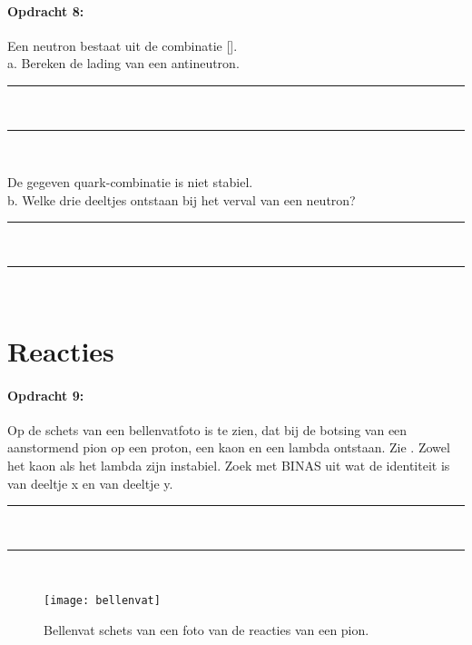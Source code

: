\paragraph{Opdracht 8:}
Een neutron bestaat uit de combinatie [\Pup\Pdown\Pdown].\\
a. Bereken de lading van een antineutron.
\begin{center}
    \rule{\textwidth}{0.3mm}\\
    \rule{\textwidth}{0.3mm}\\
\end{center}
De gegeven quark-combinatie is niet stabiel.\\
b. Welke drie deeltjes ontstaan bij het verval van een neutron?
\begin{center}
    \rule{\textwidth}{0.3mm}\\
    \rule{\textwidth}{0.3mm}\\
\end{center}

\section{Reacties}

\paragraph{Opdracht 9:}
Op de schets van een bellenvatfoto is te zien, dat bij de botsing van een 
aanstormend pion op een proton, een kaon en een lambda ontstaan. Zie 
.
Zowel het kaon als het lambda zijn instabiel.
Zoek met BINAS uit wat de identiteit is van deeltje x en van deeltje y.
\begin{center}
    \rule{\textwidth}{0.3mm}\\
    \rule{\textwidth}{0.3mm}\\
\end{center}

\begin{figure}[h]
    \centering
    \texttt{[image: bellenvat]}
    \caption{Bellenvat schets van een foto van de reacties van een pion.}
    \label{fig:bellenvat}
\end{figure}


